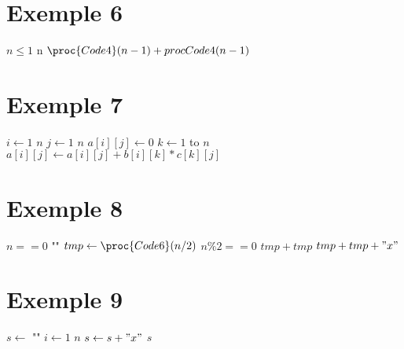 \documentclass[a4paper,10pt]{article}
\begin{document}
\section*{Exemple 6}
\begin{codebox}
    \li \If $n \leq 1$
        \Then
    \li     \Return n
    \li \Else
    \li     \Return $\proc{Code4}(n - 1) + proc{Code4}(n - 1)$
       \End
\end{codebox}
\vspace{10pt}

\section*{Exemple 7}
\begin{codebox}
    \li \For $i\gets 1$ \To $n$
    \li \Do \For $j\gets 1$ \To $n$
    \li     \Do $a[i][j]\gets 0$
    \li         \For $k\gets 1$ to $n$
    \li         \Do $a[i][j]\gets a[i][j] + b[i][k] * c[k][j]$
                \End
            \End
        \End
    \End
\end{codebox}
\vspace{10pt}

\section*{Exemple 8}
\begin{codebox}
    \li \If $n == 0$
        \Then
    \li     \Return ""
    \li \Else
    \li     $tmp\gets \proc{Code6}(n/2)$
    \li     \If $n \% 2 == 0$
            \Then
    \li         \Return $tmp + tmp$
    \li     \Else
    \li         \Return $tmp + tmp + "x"$
            \End
       \End
\end{codebox}
\vspace{10pt}

\section*{Exemple 9}
\begin{codebox}
    \li $s\gets$ ""
    \li \For $i\gets 1$ \To $n$
    \li \Do $s\gets s + "x"$
        \End
    \li \Return $s$
\end{codebox}
\vspace{10pt}
\end{document}
